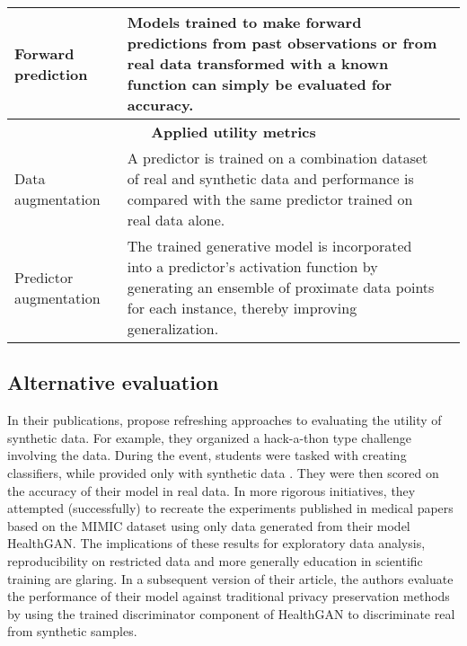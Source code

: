 \begin{table}[H]
\begin{tabularx}{\textwidth}{@{} p{} X p{} @{}}
        Forward prediction & Models trained to make forward predictions from past observations or from real data transformed with a known function can simply be evaluated for accuracy. & \cite{Xiao2018-aj,mcdermott2018semi,yoon2018imputation,Yang_2019_cdss}\\ \midrule

        \multicolumn{3}{c}{\textbf{Applied utility metrics}}\\ \midrule
        
        Data augmentation & A predictor is trained on a combination dataset of real and synthetic data and performance is compared with the same predictor trained on real data alone. & \cite{Yoon2020-anon, Yang_2019_cdss}\\
        
        Predictor augmentation & The trained generative model is incorporated into a predictor's activation function by generating an ensemble of proximate data points for each instance, thereby improving generalization. & \cite{Che_2017}\\
        
        \bottomrule
        
        \end{tabularx}
\end{table}

\subsection{Alternative evaluation}
In their publications, \citeauthor{Yale_2020} propose refreshing approaches to evaluating the utility of synthetic data. For example, they organized a hack-a-thon type challenge involving the data. During the event, students were tasked with creating classifiers, while provided only with synthetic data \cite{Yale_2020}. They were then scored on the accuracy of their model in real data. In more rigorous initiatives, they attempted (successfully) to recreate the experiments published in medical papers based on the MIMIC dataset using only data generated from their model HealthGAN. The implications of these results for exploratory data analysis, reproducibility on restricted data and more generally education in scientific training are glaring. In a subsequent version of their article, the authors evaluate the performance of their model against traditional privacy preservation methods by using the trained discriminator component of HealthGAN to discriminate real from synthetic samples.
        
